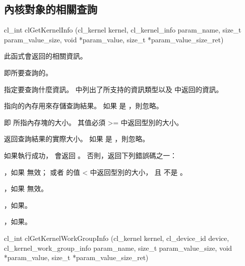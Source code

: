 \subsection{內核對象的相關查詢}


\startCLFUNC
cl_int clGetKernelInfo (cl_kernel kernel,
			cl_kernel_info param_name,
			size_t param_value_size,
			void *param_value,
			size_t *param_value_size_ret)
\stopCLFUNC

此函式會返回的相關資訊。

 即所要查詢的。

 指定要查詢什麼資訊。
中列出了所支持的資訊類型以及  中返回的資訊。

 指向的內存用來存儲查詢結果。
如果  是 ，則忽略。

 即  所指內存塊的大小。
其值必須 >= 中返回型別的大小。

 返回查詢結果的實際大小。
如果  是 ，則忽略。

{}

如果執行成功，  會返回 。
否則，返回下列錯誤碼之一：
\startigBase
\item {}，如果  無效；
或者  的值 < 中返回型別的大小，
且  不是 。

\item {}，如果  無效。

\item {}，如果\scdevfailres。

\item {}，如果\schostfailres。
\stopigBase


\startCLFUNC
cl_int clGetKernelWorkGroupInfo (cl_kernel kernel,
			cl_device_id device,
			cl_kernel_work_group_info param_name,
			size_t param_value_size,
			void *param_value,
			size_t *param_value_size_ret)
\stopCLFUNC

